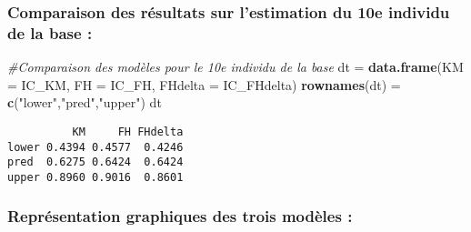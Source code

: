 \documentclass[
]{article}
\newenvironment{Shaded}{\begin{snugshade}}{\end{snugshade}}
\newcommand{\AttributeTok}[1]{\textcolor[rgb]{0.13,0.29,0.53}{#1}}
\newcommand{\CommentTok}[1]{\textcolor[rgb]{0.56,0.35,0.01}{\textit{#1}}}
\newcommand{\FunctionTok}[1]{\textcolor[rgb]{0.13,0.29,0.53}{\textbf{#1}}}
\newcommand{\NormalTok}[1]{#1}
\newcommand{\OtherTok}[1]{\textcolor[rgb]{0.56,0.35,0.01}{#1}}
\newcommand{\StringTok}[1]{\textcolor[rgb]{0.31,0.60,0.02}{#1}}
\begin{document}
\hypertarget{comparaison-des-ruxe9sultats-sur-lestimation-du-10e-individu-de-la-base}{%
\subsubsection{Comparaison des résultats sur l'estimation du 10e
individu de la base
:}\label{comparaison-des-ruxe9sultats-sur-lestimation-du-10e-individu-de-la-base}}

\begin{Shaded}
\begin{Highlighting}[]
\CommentTok{\#Comparaison des modèles pour le 10e individu de la base }
\NormalTok{dt }\OtherTok{=} \FunctionTok{data.frame}\NormalTok{(}\AttributeTok{KM =}\NormalTok{ IC\_KM, }\AttributeTok{FH =}\NormalTok{ IC\_FH, }\AttributeTok{FHdelta =}\NormalTok{ IC\_FHdelta)}
\FunctionTok{rownames}\NormalTok{(dt) }\OtherTok{=} \FunctionTok{c}\NormalTok{(}\StringTok{"lower"}\NormalTok{,}\StringTok{"pred"}\NormalTok{,}\StringTok{"upper"}\NormalTok{)}
\NormalTok{dt}
\end{Highlighting}
\end{Shaded}

\begin{verbatim}
          KM     FH FHdelta
lower 0.4394 0.4577  0.4246
pred  0.6275 0.6424  0.6424
upper 0.8960 0.9016  0.8601
\end{verbatim}

\hypertarget{repruxe9sentation-graphiques-des-trois-moduxe8les}{%
\subsubsection{Représentation graphiques des trois modèles
:}\label{repruxe9sentation-graphiques-des-trois-moduxe8les}}
\end{document}
